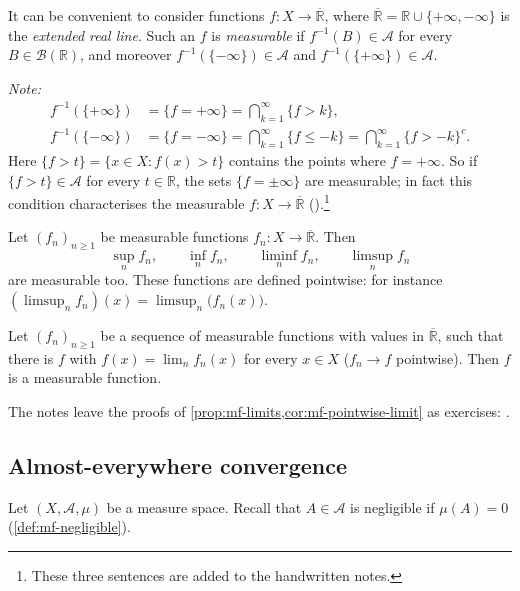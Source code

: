 \begin{remark}\label{rem:mf-extended}
It can be convenient to consider functions $f:X\to\overline{\mathbb R}$, where
$\overline{\mathbb R}=\mathbb R\cup\{+\infty,-\infty\}$ is the \emph{extended real line}. Such
an $f$ is \emph{measurable} if $f^{-1}(B)\in\mathcal A$ for every $B\in\mathcal B(\mathbb R)$,
and moreover $f^{-1}(\{-\infty\})\in\mathcal A$ and $f^{-1}(\{+\infty\})\in\mathcal A$.

\emph{Note:}
\begin{align*}
  f^{-1}(\{+\infty\})&=\{f=+\infty\}=\bigcap_{k=1}^\infty\{f>k\},\\
  f^{-1}(\{-\infty\})&=\{f=-\infty\}=\bigcap_{k=1}^\infty\{f\le -k\}=\bigcap_{k=1}^\infty\{f>-k\}^c .
\end{align*}
Here $\{f>t\}=\{x\in X:f(x)>t\}$ contains the points where $f=+\infty$. So if
$\{f>t\}\in\mathcal A$ for every $t\in\mathbb R$, the sets $\{f=\pm\infty\}$ are measurable;
in fact this condition characterises the measurable $f:X\to\overline{\mathbb R}$
().\footnote{These three sentences are added to the handwritten notes.}
\end{remark}

\begin{proposition}[Limits]\label{prop:mf-limits}
Let $(f_n)_{n\ge1}$ be measurable functions $f_n:X\to\overline{\mathbb R}$. Then
\[
  \sup_nf_n,\qquad\inf_nf_n,\qquad\liminf_nf_n,\qquad\limsup_nf_n
\]
are measurable too. These functions are defined pointwise: for instance
$(\limsup_nf_n)(x)=\limsup_n\big(f_n(x)\big)$.
\end{proposition}

\begin{corollary}\label{cor:mf-pointwise-limit}
Let $(f_n)_{n\ge1}$ be a sequence of measurable functions with values in
$\overline{\mathbb R}$, such that there is $f$ with $f(x)=\lim_nf_n(x)$ for every $x\in X$
($f_n\to f$ pointwise). Then $f$ is a measurable function.
\end{corollary}

The notes leave the proofs of \cref{prop:mf-limits,cor:mf-pointwise-limit} as exercises:
.

\subsection{Almost-everywhere convergence}\label{sec:mf-ae}

Let $(X,\mathcal A,\mu)$ be a measure space. Recall that $A\in\mathcal A$ is negligible if
$\mu(A)=0$ (\cref{def:mf-negligible}).

